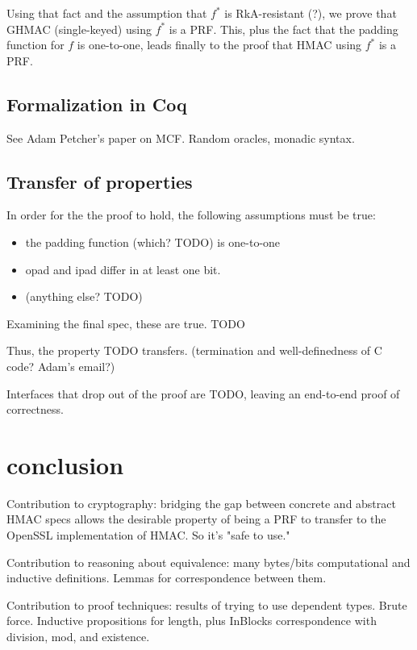 \documentclass[twocolumn,showpacs,%
  nofootinbib,aps,superscriptaddress,%
  eqsecnum,prd,notitlepage,showkeys,10pt]{revtex4-1}
\begin{document}
Using that fact and the assumption that $f^*$ is RkA-resistant (?), we prove that GHMAC (single-keyed) using $f^*$ is a PRF. This, plus the fact that the padding function for $f$ is one-to-one, leads finally to the proof that HMAC using $f^*$ is a PRF.



\subsection{Formalization in Coq}

See Adam Petcher's paper on MCF. Random oracles, monadic syntax.

\subsection{Transfer of properties}

In order for the the proof to hold, the following assumptions must be true:
\begin{itemize}
\item the padding function (which? TODO) is one-to-one
\item opad and ipad differ in at least one bit.
\item (anything else? TODO)
\end{itemize}

Examining the final spec, these are true. TODO

Thus, the property TODO transfers. (termination and well-definedness of C code? Adam's email?)

Interfaces that drop out of the proof are TODO, leaving an end-to-end proof of correctness.

\section{conclusion}

Contribution to cryptography: bridging the gap between concrete and abstract HMAC specs allows the desirable property of being a PRF to transfer to the OpenSSL implementation of HMAC. So it's "safe to use."

Contribution to reasoning about equivalence: many bytes/bits computational and inductive definitions. Lemmas for correspondence between them. 

Contribution to proof techniques: results of trying to use dependent types. Brute force. Inductive propositions for length, plus InBlocks correspondence with division, mod, and existence.
\end{document}
